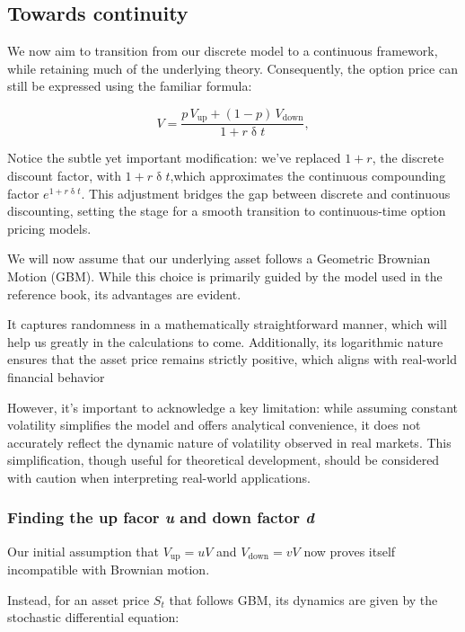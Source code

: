 \documentclass{article}
\begin{document}
    \subsection{Towards continuity}

    We now aim to transition from our discrete model to a continuous framework, while retaining much of the underlying theory.
    Consequently, the option price can still be expressed using the familiar formula:

    \[
        V = \frac{p \, V_{\text{up}} + (1 - p) \, V_{\text{down}}}{1 + r \updelta t},
    \]

    Notice the subtle yet important modification: we've replaced $1 + r$, the discrete discount factor, with $1 + r \updelta t$,which approximates the continuous compounding factor $e^{1 + r \updelta t}$.
    This adjustment bridges the gap between discrete and continuous discounting, setting the stage for a smooth transition to continuous-time option pricing models.

    We will now assume that our underlying asset follows a Geometric Brownian Motion (GBM).
    While this choice is primarily guided by the model used in the reference book, its advantages are evident.

    It captures randomness in a mathematically straightforward manner, which will help us greatly in the calculations to come.
    Additionally, its logarithmic nature ensures that the asset price remains strictly positive, which aligns with real-world financial behavior

    However, it’s important to acknowledge a key limitation: while assuming constant volatility simplifies the model and offers analytical convenience, it does not accurately reflect the dynamic nature of volatility observed in real markets.
    This simplification, though useful for theoretical development, should be considered with caution when interpreting real-world applications.

    \subsubsection{Finding the up facor \emph{u} and down factor \emph{d}}

    Our initial assumption that $V_{\text{up}} = u V$ and $V_{\text{down}} = v V$ now proves itself incompatible with Brownian motion.

    Instead, for an asset price $S_t$ that follows GBM, its dynamics are given by the stochastic differential equation:
\end{document}
